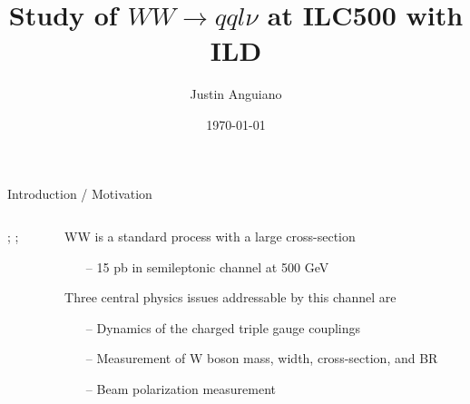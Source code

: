 \documentclass[10pt]{beamer}
\author{Justin Anguiano}
\title{Study of $WW\rightarrow qql\nu$ at ILC500 with ILD}
\institute{University Of Kansas}
\date{\today}
\begin{document}
\maketitle



\begin{frame}{Introduction / Motivation}

\begin{columns}
\begin{column}{0.5\textwidth}
;
    ;
\end{column}
\begin{column}{0.5\textwidth}
	WW is a standard process with a large cross-section 
		\begin{itemize}
		\scriptsize
		\item[--] 15 pb in semileptonic channel at 500 GeV
		\end{itemize} 
	Three central physics issues addressable by this channel are
		\begin{itemize}
		\scriptsize
		\item[--] Dynamics of the charged triple gauge couplings
		\item[--] Measurement of W boson mass, width, cross-section, and BR
		\item[--] Beam polarization measurement
		
		\end{itemize}
\end{column}
\end{columns}

\end{frame}
\end{document}
